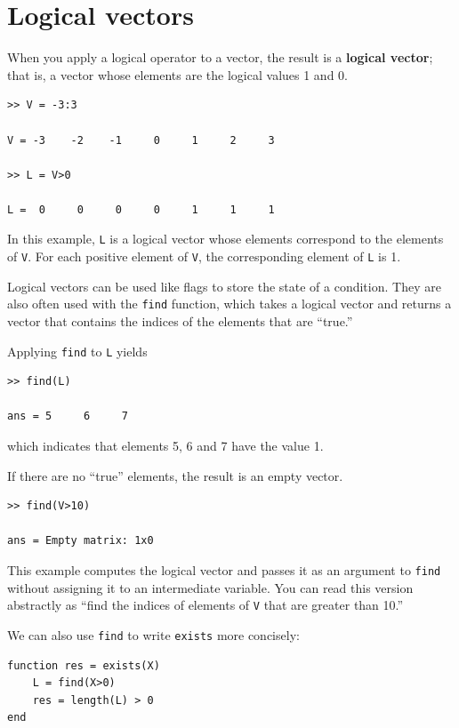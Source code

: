 \documentclass{book}
\begin{document}
\section{Logical vectors}

When you apply a logical operator to a vector, the result is a {\bf
logical vector}; that is, a vector whose elements are the logical
values 1 and 0.

\begin{verbatim}
>> V = -3:3

V = -3    -2    -1     0     1     2     3

>> L = V>0

L =  0     0     0     0     1     1     1
\end{verbatim}

In this example, {\tt L} is a logical vector whose elements
correspond to the elements of {\tt V}.  For each positive element of
{\tt V}, the corresponding element of {\tt L} is 1.

Logical vectors can be used like flags to store the state of
a condition.  They are also often used with the {\tt find} function,
which takes a logical vector and returns a vector that contains
the indices of the elements that are ``true.''

Applying {\tt find} to {\tt L} yields

\begin{verbatim}
>> find(L)

ans = 5     6     7
\end{verbatim}

which indicates that elements 5, 6 and 7 have the value 1.

If there are no ``true'' elements, the result is an empty vector.

\begin{verbatim}
>> find(V>10)

ans = Empty matrix: 1x0
\end{verbatim}

This example computes the logical vector and passes it as an
argument to {\tt find} without assigning it to an intermediate
variable.  You can read this version abstractly as ``find
the indices of elements of {\tt V} that are greater than 10.''

We can also use {\tt find} to write {\tt exists} more concisely:

\begin{verbatim}
function res = exists(X)
    L = find(X>0)
    res = length(L) > 0
end
\end{verbatim}
\end{document}
